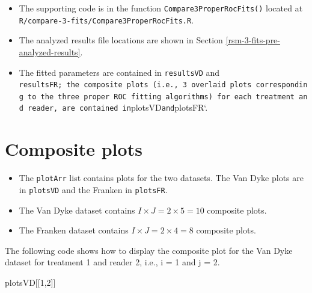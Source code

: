 \documentclass[
]{book}
\newenvironment{Shaded}{\begin{snugshade}}{\end{snugshade}}
\newcommand{\DecValTok}[1]{\textcolor[rgb]{0.00,0.00,0.81}{#1}}
\newcommand{\NormalTok}[1]{#1}
\providecommand{\tightlist}{%
  \setlength{\itemsep}{0pt}\setlength{\parskip}{0pt}}
\begin{document}
\begin{itemize}
\tightlist
\item
  The supporting code is in the function \texttt{Compare3ProperRocFits()} located at \texttt{R/compare-3-fits/Compare3ProperRocFits.R}.
\item
  The analyzed results file locations are shown in Section \ref{rsm-3-fits-pre-analyzed-results}.
\item
  The fitted parameters are contained in \texttt{resultsVD} and \texttt{resultsFR;\ the\ composite\ plots\ (i.e.,\ 3\ overlaid\ plots\ corresponding\ to\ the\ three\ proper\ ROC\ fitting\ algorithms)\ for\ each\ treatment\ and\ reader,\ are\ contained\ in}plotsVD\texttt{and}plotsFR`.
\end{itemize}

\hypertarget{rsm-3-fits-composite-plots}{%
\section{Composite plots}\label{rsm-3-fits-composite-plots}}

\begin{itemize}
\tightlist
\item
  The \texttt{plotArr} list contains plots for the two datasets. The Van Dyke plots are in \texttt{plotsVD} and the Franken in \texttt{plotsFR}.
\item
  The Van Dyke dataset contains \(I \times J = 2 \times 5 = 10\) composite plots.
\item
  The Franken dataset contains \(I \times J = 2 \times 4 = 8\) composite plots.
\end{itemize}

The following code shows how to display the composite plot for the Van Dyke dataset for treatment 1 and reader 2, i.e., i = 1 and j = 2.

\begin{Shaded}
\begin{Highlighting}[]
\NormalTok{plotsVD[[}\DecValTok{1}\NormalTok{,}\DecValTok{2}\NormalTok{]]}
\end{Highlighting}
\end{Shaded}
\end{document}
